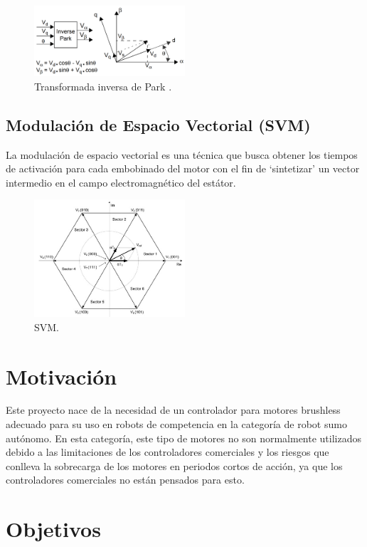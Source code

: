 \documentclass[11pt]{report}
\begin{document}
\begin{figure}[ht]
    \centering
    \includegraphics[width=0.5\textwidth]{imagenes/park_inv.png}
    \caption{Transformada inversa de Park \cite{AN1078}.}
\end{figure}
\FloatBarrier


\subsection{Modulación de Espacio Vectorial (SVM)}
La modulación de espacio vectorial es una técnica que busca obtener los tiempos de activación para cada embobinado del motor con el fin de ‘sintetizar’ un vector intermedio en el campo electromagnético del estátor.

\begin{figure}[ht]
	\centering
	\includegraphics[width=0.5\textwidth]{imagenes/image909-0000.jpg}
	\caption{SVM.}
\end{figure}
\FloatBarrier

\newpage
\section{Motivación}
Este proyecto nace de la necesidad de un controlador para motores brushless adecuado para su uso en robots de competencia en la categoría de robot sumo autónomo. En esta categoría, este tipo de motores no son normalmente utilizados debido a las limitaciones de los controladores comerciales y los riesgos que conlleva la sobrecarga de los motores en periodos cortos de acción, ya que los controladores comerciales no están pensados para esto.

\section{Objetivos}
\end{document}
